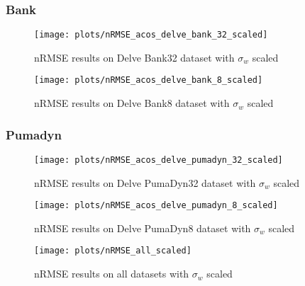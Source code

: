 \subsubsection{Bank}

\begin{figure}[H]
    \texttt{[image: plots/nRMSE\_acos\_delve\_bank\_32\_scaled]}
    \caption{nRMSE results on Delve Bank32 dataset with $\sigma_w$ scaled}
    \label{fig:nrmse-acos-delve-bank-32-scaled}
\end{figure}

\begin{figure}[H]
    \texttt{[image: plots/nRMSE\_acos\_delve\_bank\_8\_scaled]}
    \caption{nRMSE results on Delve Bank8 dataset with $\sigma_w$ scaled}
    \label{fig:nrmse-acos-delve-bank-8-scaled}
\end{figure}

\subsubsection{Pumadyn}

\begin{figure}[H]
    \texttt{[image: plots/nRMSE\_acos\_delve\_pumadyn\_32\_scaled]}
    \caption{nRMSE results on Delve PumaDyn32 dataset with $\sigma_w$ scaled}
    \label{fig:nrmse-acos-delve-pumadyn-32-scaled}
\end{figure}

\begin{figure}[H]
    \texttt{[image: plots/nRMSE\_acos\_delve\_pumadyn\_8\_scaled]}
    \caption{nRMSE results on Delve PumaDyn8 dataset with $\sigma_w$ scaled}
    \label{fig:nrmse-acos-delve-pumadyn-8-scaled}
\end{figure}

\begin{figure}[H]
    \texttt{[image: plots/nRMSE\_all\_scaled]}
    \caption{nRMSE results on all datasets with $\sigma_w$ scaled}
    \label{fig:nrmse-all-scaled}
\end{figure}


